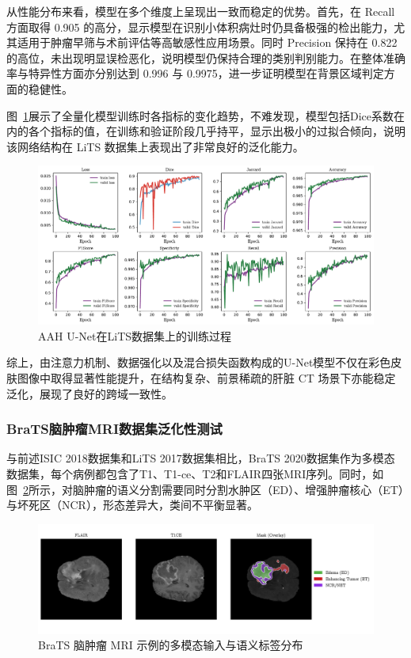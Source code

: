从性能分布来看，模型在多个维度上呈现出一致而稳定的优势。首先，在 Recall 方面取得 0.905 的高分，显示模型在识别小体积病灶时仍具备极强的检出能力，尤其适用于肿瘤早筛与术前评估等高敏感性应用场景。同时 Precision 保持在 0.822 的高位，未出现明显误检恶化，说明模型仍保持合理的类别判别能力。在整体准确率与特异性方面亦分别达到 0.996 与 0.9975，进一步证明模型在背景区域判定方面的稳健性。

图~\ref{fig:LITS_fanhua}展示了全量化模型训练时各指标的变化趋势，不难发现，模型包括Dice系数在内的各个指标的值，在训练和验证阶段几乎持平，显示出极小的过拟合倾向，说明该网络结构在 LiTS 数据集上表现出了非常良好的泛化能力。

\begin{figure}[!h]
    \centering
    \includegraphics[width=\textwidth]{fig/LITS_fanhua.pdf}
    \caption{AAH U-Net在LiTS数据集上的训练过程}
    \label{fig:LITS_fanhua}
\end{figure}

综上，由注意力机制、数据强化以及混合损失函数构成的U-Net模型不仅在彩色皮肤图像中取得显著性能提升，在结构复杂、前景稀疏的肝脏 CT 场景下亦能稳定泛化，展现了良好的跨域一致性。

\subsubsection{BraTS脑肿瘤MRI数据集泛化性测试}

与前述ISIC 2018数据集和LiTS 2017数据集相比，BraTS 2020数据集作为多模态数据集，每个病例都包含了T1、T1-ce、T2和FLAIR四张MRI序列。同时，如图~\ref{fig:final}所示，对脑肿瘤的语义分割需要同时分割水肿区（ED）、增强肿瘤核心（ET）与坏死区（NCR），形态差异大，类间不平衡显著。

\begin{figure}[!h]
    \centering
    \includegraphics[width=\textwidth]{fig/final_3view_with_right_legend.png}
    \caption{BraTS 脑肿瘤 MRI 示例的多模态输入与语义标签分布}
    \label{fig:final}
\end{figure}


